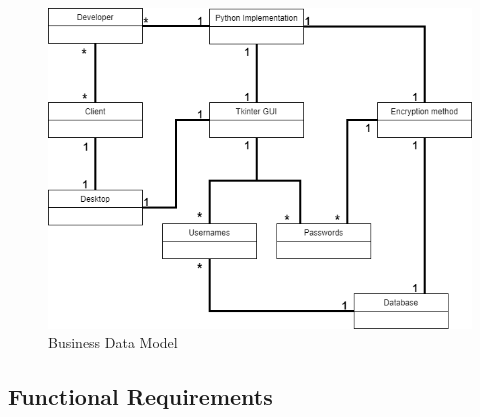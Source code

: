\documentclass[12pt, titlepage]{article}
\begin{document}
\begin{figure}[h]
\includegraphics[scale=0.5]{Images/BusinessModel.png}
\caption{Business Data Model}
\end{figure}

\subsection{Functional Requirements}
\end{document}
